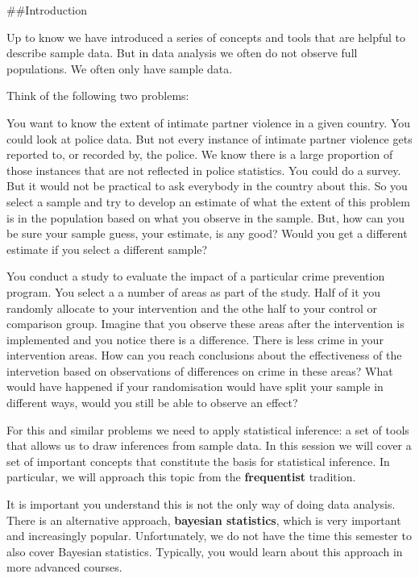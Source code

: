 \documentclass[]{book}
\theoremstyle{definition}
\theoremstyle{definition}
\theoremstyle{definition}
\theoremstyle{remark}
\begin{document}
\#\#Introduction

Up to know we have introduced a series of concepts and tools that are
helpful to describe sample data. But in data analysis we often do not
observe full populations. We often only have sample data.

Think of the following two problems:

You want to know the extent of intimate partner violence in a given
country. You could look at police data. But not every instance of
intimate partner violence gets reported to, or recorded by, the police.
We know there is a large proportion of those instances that are not
reflected in police statistics. You could do a survey. But it would not
be practical to ask everybody in the country about this. So you select a
sample and try to develop an estimate of what the extent of this problem
is in the population based on what you observe in the sample. But, how
can you be sure your sample guess, your estimate, is any good? Would you
get a different estimate if you select a different sample?

You conduct a study to evaluate the impact of a particular crime
prevention program. You select a a number of areas as part of the study.
Half of it you randomly allocate to your intervention and the othe half
to your control or comparison group. Imagine that you observe these
areas after the intervention is implemented and you notice there is a
difference. There is less crime in your intervention areas. How can you
reach conclusions about the effectiveness of the intervetion based on
observations of differences on crime in these areas? What would have
happened if your randomisation would have split your sample in different
ways, would you still be able to observe an effect?

For this and similar problems we need to apply statistical inference: a
set of tools that allows us to draw inferences from sample data. In this
session we will cover a set of important concepts that constitute the
basis for statistical inference. In particular, we will approach this
topic from the \textbf{frequentist} tradition.

It is important you understand this is not the only way of doing data
analysis. There is an alternative approach, \textbf{bayesian
statistics}, which is very important and increasingly popular.
Unfortunately, we do not have the time this semester to also cover
Bayesian statistics. Typically, you would learn about this approach in
more advanced courses.
\end{document}
